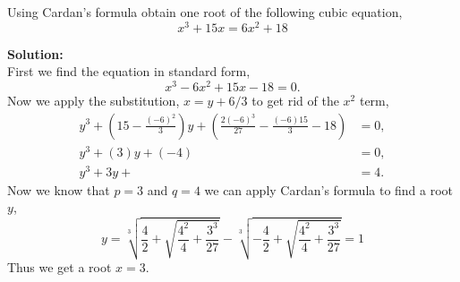 \documentclass[12pt]{article}
\makeatletter
\theoremstyle{homework}
\newenvironment{exercise}[1]
{\def\@currentlabel{#1}\exercisecore}
{\endexercisecore}
\newcommand{\localhead}[1]{\par\smallskip\noindent\textbf{#1}\nobreak\\}%
\newcommand\solution{\localhead{Solution:}}
\makeatother
\begin{document}
\begin{exercise}{3.b} Using Cardan's formula obtain one root of the following cubic equation,
  \begin{equation*}
    x^3 + 15x = 6x^2 + 18
  \end{equation*}
  \solution First we find the equation in standard form,
  \begin{equation*}
    x^3 - 6x^2 + 15x - 18 = 0.
  \end{equation*}
  Now we apply the substitution, $x = y + 6/3$ to get rid of the $x^2$ term, 
  \begin{align*}
    y^3 + (15 - \frac{(-6)^2}{3})y + (\frac{2(-6)^3}{27} - \frac{(-6)15}{3} - 18) &= 0,\\
    y^3 + (3)y + (-4) &= 0,\\
    y^3 + 3y + &= 4.
  \end{align*}
 Now we know that $p = 3$ and $q = 4$ we can apply Cardan's formula to find a root $y$, 
 \begin{equation*}
   y = \sqrt[3]{\frac{4}{2} + \sqrt{\frac{4^2}{4} + \frac{3^3}{27}}} - \sqrt[3]{-\frac{4}{2} + \sqrt{\frac{4^2}{4} + \frac{3^3}{27}}} = 1
 \end{equation*}
 Thus we get a root $x = 3$.

\end{exercise}
\vspace{.5in}
\end{document}

